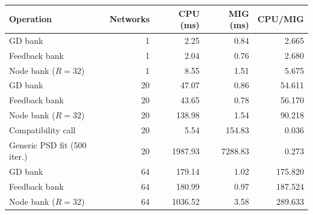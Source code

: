 \begin{tabular}{lr rrr}
\hline
Operation & Networks & CPU (ms) & MIG (ms) & CPU/MIG \\
\hline
GD bank & 1 & 2.25 & 0.84 & 2.665 \\
Feedback bank & 1 & 2.04 & 0.76 & 2.680 \\
Node bank ($R=32$) & 1 & 8.55 & 1.51 & 5.675 \\
GD bank & 20 & 47.07 & 0.86 & 54.611 \\
Feedback bank & 20 & 43.65 & 0.78 & 56.170 \\
Node bank ($R=32$) & 20 & 138.98 & 1.54 & 90.218 \\
Compatibility call & 20 & 5.54 & 154.83 & 0.036 \\
Generic PSD fit (500 iter.) & 20 & 1987.93 & 7288.83 & 0.273 \\
GD bank & 64 & 179.14 & 1.02 & 175.820 \\
Feedback bank & 64 & 180.99 & 0.97 & 187.524 \\
Node bank ($R=32$) & 64 & 1036.52 & 3.58 & 289.633 \\
\hline
\end{tabular}
